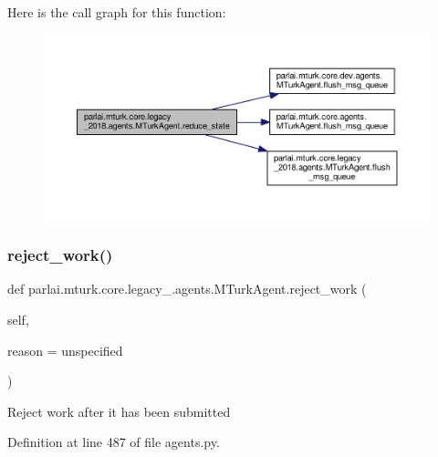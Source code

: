 Here is the call graph for this function\+:
\nopagebreak
\begin{figure}[H]
\begin{center}
\leavevmode
\includegraphics[width=350pt]{classparlai_1_1mturk_1_1core_1_1legacy__2018_1_1agents_1_1MTurkAgent_ad6b25298f44461404805c398c3f08ac5_cgraph}
\end{center}
\end{figure}
\mbox{\label{classparlai_1_1mturk_1_1core_1_1legacy__2018_1_1agents_1_1MTurkAgent_a9343b55ce980daa021253197a1852668}} 
\subsubsection{\texorpdfstring{reject\+\_\+work()}{reject\_work()}}
{\footnotesize\ttfamily def parlai.\+mturk.\+core.\+legacy\+\_.\+agents.\+M\+Turk\+Agent.\+reject\+\_\+work (\begin{DoxyParamCaption}\item[{}]{self,  }\item[{}]{reason = {\ttfamily \textquotesingle{}unspecified\textquotesingle{}} }\end{DoxyParamCaption})}

\begin{DoxyVerb}Reject work after it has been submitted\end{DoxyVerb}
 

Definition at line 487 of file agents.\+py.



